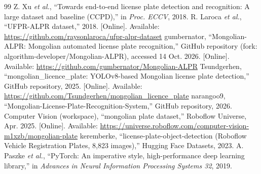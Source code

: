 \begin{thebibliography}{99}
 Z. Xu \emph{et al.}, ``Towards end-to-end license plate detection and recognition: A large dataset and baseline (CCPD),'' in \emph{Proc. ECCV}, 2018.
 R. Laroca \emph{et al.}, ``UFPR-ALPR dataset,'' 2018. [Online]. Available: \url{https://github.com/raysonlaroca/ufpr-alpr-dataset}
 gumbernator, ``Mongolian-ALPR: Mongolian automated license plate recognition,'' GitHub repository (fork: algorithm-developer/Mongolian-ALPR), accessed 14 Oct. 2026. [Online]. Available: \url{https://github.com/gumbernator/Mongolian-ALPR}
 Tsundgerhen, ``mongolian\_licence\_plate: YOLOv8-based Mongolian license plate detection,'' GitHub repository, 2025. [Online]. Available: \url{https://github.com/Tsundgerhen/mongolian_licence_plate}
 narangoo9, ``Mongolian-License-Plate-Recognition-System,'' GitHub repository, 2026.
 Computer Vision (workspace), ``mongolian plate dataset,'' Roboflow Universe, Apr. 2025. [Online]. Available: \url{https://universe.roboflow.com/computer-vision-m1xzb/mongolian-plate}
 keremberke, ``license-plate-object-detection (Roboflow Vehicle Registration Plates, 8,823 images),'' Hugging Face Datasets, 2023.
 A. Paszke \emph{et al.}, ``PyTorch: An imperative style, high-performance deep learning library,'' in \emph{Advances in Neural Information Processing Systems 32}, 2019.
\end{thebibliography}

